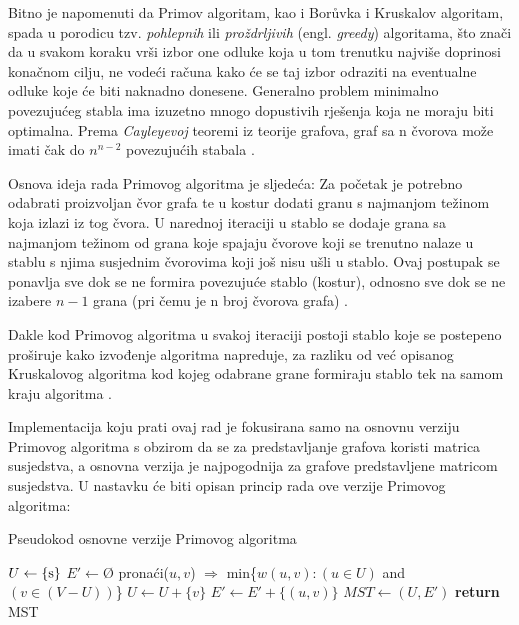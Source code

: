 \documentclass[conference]{IEEEtran}
\begin{document}
Bitno je napomenuti da Primov algoritam, kao i Borůvka i Kruskalov algoritam, spada u porodicu tzv. \textit{pohlepnih} ili \textit{proždrljivih} (engl. \textit{greedy}) algoritama, što znači da u svakom koraku vrši izbor one odluke koja u tom trenutku najviše doprinosi konačnom cilju, ne vodeći računa kako će se taj izbor odraziti na eventualne odluke koje će biti naknadno donesene. Generalno problem minimalno povezujućeg stabla ima izuzetno mnogo dopustivih rješenja koja ne moraju biti optimalna. Prema \textit{Cayleyevoj} teoremi iz teorije grafova, graf sa n čvorova može imati čak do $n^{n-2}$ povezujućih stabala \cite{b4}.


Osnova ideja rada Primovog algoritma je sljedeća: Za početak je potrebno odabrati proizvoljan čvor grafa te u kostur dodati granu s najmanjom težinom koja izlazi iz tog čvora. U narednoj iteraciji u stablo se dodaje grana sa najmanjom težinom od grana koje spajaju čvorove koji se trenutno nalaze u stablu s njima susjednim čvorovima koji još nisu ušli u stablo. Ovaj postupak se ponavlja sve dok se ne formira povezujuće stablo (kostur), odnosno sve dok se ne izabere $n-1$ grana (pri čemu je n broj čvorova grafa) \cite{b1}.

Dakle kod Primovog algoritma u svakoj iteraciji postoji stablo koje se postepeno proširuje kako izvođenje algoritma napreduje, za razliku od već opisanog Kruskalovog algoritma kod kojeg odabrane grane formiraju stablo tek na samom kraju algoritma \cite{b1}.

Implementacija koju prati ovaj rad je fokusirana samo na osnovnu verziju Primovog algoritma s obzirom da se za predstavljanje grafova koristi matrica susjedstva, a osnovna verzija je najpogodnija za grafove predstavljene matricom susjedstva. U nastavku će biti opisan princip rada ove verzije Primovog algoritma:



\begin{algorithm}
\caption{Pseudokod osnovne verzije Primovog algoritma}
\begin{algorithmic}[1]
    \State $U\gets \textnormal{\{s\}}$
    \State $E'\gets Ø$
        \State pronaći($u, v$) $\Rightarrow$ min\{$w(u, v) : (u \in U)$ and $(v \in (V - U))$\}
        \State $U \gets U + \{v\}$
        \State $E' \gets E' + \{(u, v)\}$
    \EndWhile
    \State $MST \gets (U, E')$
    \State \textbf{return} MST
\EndProcedure
\end{algorithmic}
\label{algo}
\end{algorithm}
\end{document}
